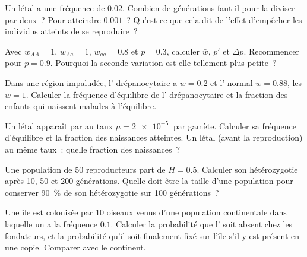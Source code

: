 \begin{exercise}[$\star\star$]\label{exo:b2:population-genetics:5}
Un   létal a une fréquence de $0.02$. Combien de
générations faut-il pour la diviser par deux~? Pour atteindre $0.001$~?
Qu'est-ce que cela dit de l'effet d'empêcher les individus atteints de
se reproduire~?
\end{exercise}

\begin{exercise}[$\star\star$]\label{exo:b2:population-genetics:6}
Avec $w_{AA} = 1$, $w_{Aa} = 1$, $w_{aa} = 0.8$ et $p = 0.3$, calculer
$\bar w$, $p'$ et $\Delta p$. Recommencer pour $p = 0.9$. Pourquoi la
seconde variation est-elle tellement plus petite~?
\end{exercise}

\begin{exercise}[$\star\star$]\label{exo:b2:population-genetics:7}
Dans une région impaludée, l' drépanocytaire a $w = 0.2$ et
l' normal
$w = 0.88$, les  $w = 1$. Calculer la fréquence d'équilibre
de l' drépanocytaire et la fraction des enfants qui naissent
malades à l'équilibre.
\end{exercise}

\begin{exercise}[$\star\star$]\label{exo:b2:population-genetics:8}
Un létal  apparaît par  au taux $\mu = \qty{2e-5}{}$ par
gamète. Calculer sa fréquence d'équilibre et la fraction des naissances
atteintes. Un létal  (avant la reproduction) au même taux~:
quelle fraction des naissances~?
\end{exercise}

\begin{exercise}[$\star\star$]\label{exo:b2:population-genetics:9}
Une population de 50 reproducteurs part de $H = 0.5$.
Calculer son hétérozygotie après 10, 50 et 200 générations. Quelle doit
être la taille d'une population pour conserver \qty{90}{\%} de son
hétérozygotie sur 100 générations~?
\end{exercise}

\begin{exercise}[$\star\star\star$]\label{exo:b2:population-genetics:10}
Une île est colonisée par 10 oiseaux venus d'une population continentale
dans laquelle un  a la fréquence $0.1$. Calculer la probabilité que
l' soit absent chez les fondateurs, et la probabilité qu'il soit
finalement fixé sur l'île s'il y est présent en une copie. Comparer avec
le continent.
\end{exercise}

